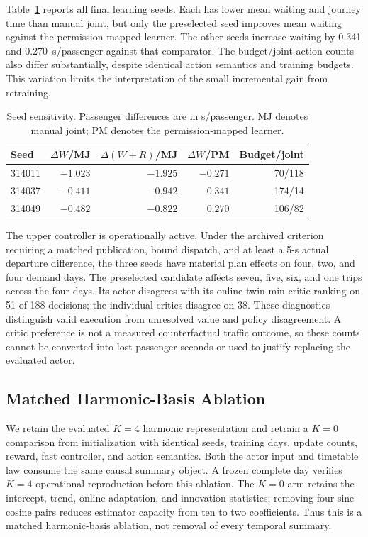 Table~\ref{tab:seed_results} reports all final learning seeds. Each has lower
mean waiting and journey time than manual joint, but only the preselected seed
improves mean waiting against the permission-mapped learner. The other seeds
increase waiting by 0.341 and 0.270~s/passenger against that comparator. The
budget/joint action counts also differ substantially, despite identical action
semantics and training budgets. This variation limits the interpretation of the
small incremental gain from retraining.

\begin{table}[t]
\centering
\caption{Seed sensitivity. Passenger differences are in s/passenger. MJ denotes
manual joint; PM denotes the permission-mapped learner.}
\label{tab:seed_results}
\setlength{\tabcolsep}{3pt}
\footnotesize
\begin{tabular}{lrrrr}
\toprule
Seed & $\Delta W$/MJ & $\Delta(W+R)$/MJ & $\Delta W$/PM & Budget/joint \\
\midrule
314011 & $-1.023$ & $-1.925$ & $-0.271$ & 70/118 \\
314037 & $-0.411$ & $-0.942$ & $0.341$ & 174/14 \\
314049 & $-0.482$ & $-0.822$ & $0.270$ & 106/82 \\
\bottomrule
\end{tabular}
\end{table}

The upper controller is operationally active. Under the archived criterion
requiring a matched publication, bound dispatch, and at least a 5-s actual
departure difference, the three seeds have material plan effects on four, two,
and four demand days. The preselected candidate affects seven, five, six, and
one trips across the four days. Its actor disagrees with its online twin-min
critic ranking on 51 of 188 decisions; the individual critics disagree on
38. These diagnostics distinguish valid execution from unresolved value and
policy disagreement. A critic preference is not a measured counterfactual
traffic outcome, so these counts cannot be converted into lost passenger
seconds or used to justify replacing the evaluated actor.

\subsection{Matched Harmonic-Basis Ablation}
\label{sec:harmonic_ablation}

We retain the evaluated $K=4$ harmonic representation and retrain a $K=0$
comparison from initialization with identical seeds, training days, update
counts, reward, fast controller, and action semantics. Both the actor input and
timetable law consume the same causal summary object. A frozen complete day verifies $K=4$ operational reproduction before this
ablation. The $K=0$ arm retains the intercept, trend, online adaptation, and
innovation statistics; removing four sine--cosine pairs reduces estimator
capacity from ten to two coefficients. Thus this is a matched harmonic-basis
ablation, not removal of every temporal summary.

